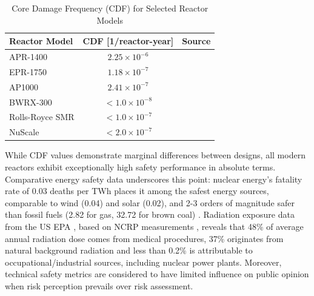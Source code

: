 \begin{table}[!ht]
    \centering
    \begin{tabularx}{\textwidth}{X c c}
        \toprule
        \textbf{Reactor Model} & \textbf{CDF [1/reactor-year]} & Source\\
        \midrule
        APR-1400         & $2.25 \times 10^{-6}$ & \cite{KHNP_EU_APR_Characteristics} \\
        EPR-1750         & $1.18 \times 10^{-7}$ & \cite{EDFEnergy_PSA_2012} \\
        AP1000           & $2.41 \times 10^{-7}$ & \cite{NRC_ML23161A411} \\
        BWRX-300         & $<1.0 \times 10^{-8}$ & \cite{ENCO_SMR_Analysis_2022} \\
        Rolls-Royce SMR  & $<1.0 \times 10^{-7}$ & \cite{ENCO_SMR_Analysis_2022} \\
        NuScale          & $<2.0 \times 10^{-7}$ & \cite{ENCO_SMR_Analysis_2022} \\
        \bottomrule
    \end{tabularx}
    \caption{Core Damage Frequency (CDF) for Selected Reactor Models}
    \label{tab:safety-performance}
\end{table}

While CDF values demonstrate marginal differences between designs, all modern reactors exhibit exceptionally high safety performance in absolute terms. Comparative energy safety data underscores this point: nuclear energy's fatality rate of 0.03 deaths per TWh places it among the safest energy sources, comparable to wind (0.04) and solar (0.02), and 2-3 orders of magnitude safer than fossil fuels (2.82 for gas, 32.72 for brown coal) \cite{Markandya_Wilkinson_2007, SOVACOOL20163952, OurWorldInData_EnergyDeathRates_2025}. Radiation exposure data from the US EPA \cite{EPA_Radiation_Sources_2025}, based on NCRP measurements \cite{NCRP_Report_160_2009}, reveals that 48\% of average annual radiation dose comes from medical procedures, 37\% originates from natural background radiation and less than 0.2\% is attributable to occupational/industrial sources, including nuclear power plants. Moreover, technical safety metrics are considered to have limited influence on public opinion when risk perception prevails over risk assessment.

